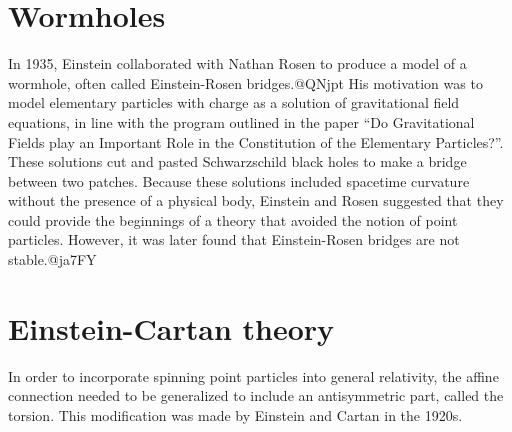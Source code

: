 \documentclass[twoside]{memoir}
\begin{document}
\section{Wormholes}
In 1935, Einstein collaborated with Nathan Rosen to produce a model of a wormhole, often called Einstein-Rosen bridges.@QNjpt His motivation was to model elementary particles with charge as a solution of gravitational field equations, in line with the program outlined in the paper \enquote{Do Gravitational Fields play an Important Role in the Constitution of the Elementary Particles?}. These solutions cut and pasted Schwarzschild black holes to make a bridge between two patches. Because these solutions included spacetime curvature without the presence of a physical body, Einstein and Rosen suggested that they could provide the beginnings of a theory that avoided the notion of point particles. However, it was later found that Einstein-Rosen bridges are not stable.@ja7FY
\section{Einstein-Cartan theory}
In order to incorporate spinning point particles into general relativity, the affine connection needed to be generalized to include an antisymmetric part, called the torsion. This modification was made by Einstein and Cartan in the 1920s.
\end{document}
